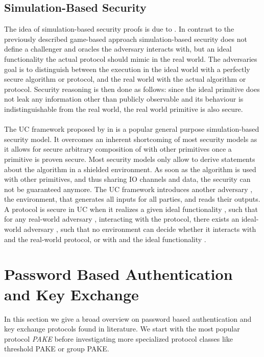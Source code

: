 \subsection{Simulation-Based Security}
The idea of simulation-based security proofs is due to \citeauthor{Goldreich87} \cite{Goldreich87} \citeyear{Goldreich87}.
In contrast to the previously described game-based approach simulation-based security does not define a challenger and oracles the adversary interacts with, but an ideal functionality the actual protocol should mimic in the real world.
The adversaries goal is to distinguish between the execution in the ideal world with a perfectly secure algorithm or protocol, and the real world with the actual algorithm or protocol.
Security reasoning is then done as follows: since the ideal primitive does not leak any information other than publicly observable and its behaviour is indistinguishable from the real world, the real world primitive is also secure.

\paragraph{}
The \ac{UC} framework proposed by \citeauthor{Canetti2001a} \cite{Canetti2001a} in \citeyear{Canetti2001a} is a popular general purpose simulation-based security model.
It overcomes an inherent shortcoming of most security models as it allows for secure arbitrary composition of with other primitives once a primitive is proven secure.
Most security models only allow to derive statements about the algorithm in a shielded environment.
As soon as the algorithm is used with other primitives, and thus sharing \ac{IO} channels and data, the security can not be guaranteed anymore.
The \ac{UC} framework introduces another adversary \UCZ, the environment, that generates all inputs for all parties, and reads their outputs.
A protocol is secure in \ac{UC} when it realizes a given ideal functionality \UCF, such that for any real-world adversary \A, interacting with the protocol, there exists an ideal-world adversary \UCS, such that no environment \UCZ can decide whether it interacts with \A and the real-world protocol, or with \UCS and the ideal functionality \UCF.


\section{Password Based Authentication and Key Exchange}
In this section we give a broad overview on password based authentication and key exchange protocols found in literature.
We start with the most popular protocol \emph{\ac{PAKE}} before investigating more specialized protocol classes like threshold \ac{PAKE} or group \ac{PAKE}.

